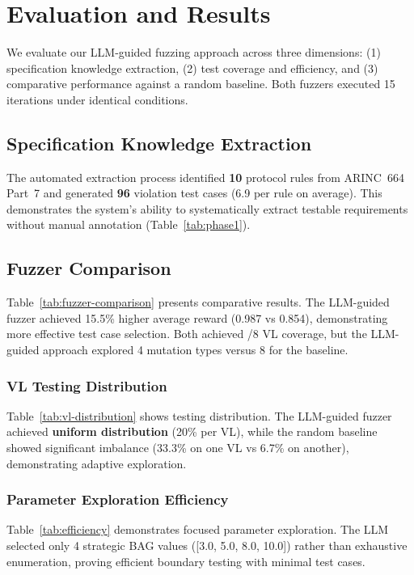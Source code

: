 \section{Evaluation and Results}
\label{sec:evaluation}

We evaluate our LLM-guided fuzzing approach across three dimensions: 
(1) specification knowledge extraction, 
(2) test coverage and efficiency, and 
(3) comparative performance against a random baseline. 
Both fuzzers executed 15 iterations under identical conditions.

\subsection{Specification Knowledge Extraction}

The automated extraction process identified \textbf{10} 
protocol rules from ARINC~664 Part~7 and generated \textbf{96} 
violation test cases (6.9 per rule on average). 
This demonstrates the system's ability to systematically extract 
testable requirements without manual annotation (Table~\ref{tab:phase1}).

\subsection{Fuzzer Comparison}

Table~\ref{tab:fuzzer-comparison} presents comparative results. 
The LLM-guided fuzzer achieved 15.5\% higher average reward 
(0.987 vs 0.854), demonstrating more effective test case selection. 
Both achieved {}/8 VL coverage, but the LLM-guided approach explored 
4 mutation types versus 8 for the baseline.

\subsubsection{VL Testing Distribution}

Table~\ref{tab:vl-distribution} shows testing distribution. 
The LLM-guided fuzzer achieved \textbf{uniform distribution} (20\% per VL), 
while the random baseline showed significant imbalance 
(33.3\% on one VL vs 6.7\% on another), demonstrating adaptive exploration.

\subsubsection{Parameter Exploration Efficiency}

Table~\ref{tab:efficiency} demonstrates focused parameter exploration. 
The LLM selected only 4 strategic BAG values 
([3.0, 5.0, 8.0, 10.0]) rather than exhaustive enumeration, 
proving efficient boundary testing with minimal test cases.

